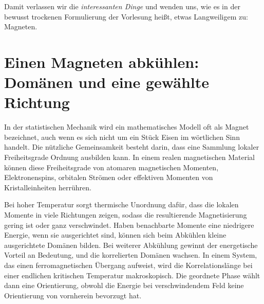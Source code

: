 Damit verlassen wir die \emph{interessanten Dinge} und wenden uns, wie es in der bewusst trockenen Formulierung der Vorlesung heißt, etwas Langweiligem zu: Magneten.

\section{Einen Magneten abkühlen: Domänen und eine gewählte Richtung}

In der statistischen Mechanik wird ein mathematisches Modell oft als Magnet bezeichnet, auch wenn es sich nicht um ein Stück Eisen im wörtlichen Sinn handelt. Die nützliche Gemeinsamkeit besteht darin, dass eine Sammlung lokaler Freiheitsgrade Ordnung ausbilden kann. In einem realen magnetischen Material können diese Freiheitsgrade von atomaren magnetischen Momenten, Elektronenspins, orbitalen Strömen oder effektiven Momenten von Kristalleinheiten herrühren.

Bei hoher Temperatur sorgt thermische Unordnung dafür, dass die lokalen Momente in viele Richtungen zeigen, sodass die resultierende Magnetisierung gering ist oder ganz verschwindet. Haben benachbarte Momente eine niedrigere Energie, wenn sie ausgerichtet sind, können sich beim Abkühlen kleine ausgerichtete Domänen bilden. Bei weiterer Abkühlung gewinnt der energetische Vorteil an Bedeutung, und die korrelierten Domänen wachsen. In einem System, das einen ferromagnetischen Übergang aufweist, wird die Korrelationslänge bei einer endlichen kritischen Temperatur makroskopisch. Die geordnete Phase wählt dann eine Orientierung, obwohl die Energie bei verschwindendem Feld keine Orientierung von vornherein bevorzugt hat.

\begin{classroomqa}
\end{classroomqa}

\begin{classroomqa}
\end{classroomqa}

